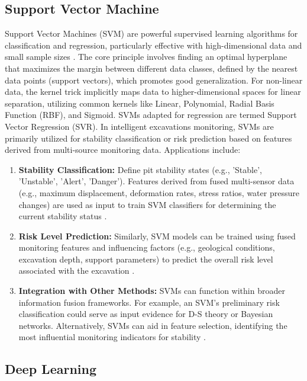 \documentclass[preprint,11pt,authoryear,3p]{elsarticle}
\begin{document}
\subsection{Support Vector Machine}

Support Vector Machines (SVM) are powerful supervised learning algorithms for classification and regression, particularly effective with high-dimensional data and small sample sizes \citep{Murphy2022Intro}. The core principle involves finding an optimal hyperplane that maximizes the margin between different data classes, defined by the nearest data points (support vectors), which promotes good generalization. For non-linear data, the kernel trick implicitly maps data to higher-dimensional spaces for linear separation, utilizing common kernels like Linear, Polynomial, Radial Basis Function (RBF), and Sigmoid. SVMs adapted for regression are termed Support Vector Regression (SVR). In intelligent excavations monitoring, SVMs are primarily utilized for stability classification or risk prediction based on features derived from multi-source monitoring data. Applications include:

\begin{enumerate}
    \item \textbf{Stability Classification:} Define pit stability states (e.g., 'Stable', 'Unstable', 'Alert', 'Danger'). Features derived from fused multi-sensor data (e.g., maximum displacement, deformation rates, stress ratios, water pressure changes) are used as input to train SVM classifiers for determining the current stability status \citep{LI20231019}.

    \item \textbf{Risk Level Prediction:} Similarly, SVM models can be trained using fused monitoring features and influencing factors (e.g., geological conditions, excavation depth, support parameters) to predict the overall risk level associated with the excavation \citep{PAN2024109578}.

    \item \textbf{Integration with Other Methods:} SVMs can function within broader information fusion frameworks. For example, an SVM's preliminary risk classification could serve as input evidence for D-S theory or Bayesian networks. Alternatively, SVMs can aid in feature selection, identifying the most influential monitoring indicators for stability \citep{WU2024105516}.
\end{enumerate}

\subsection{Deep Learning}
\end{document}
